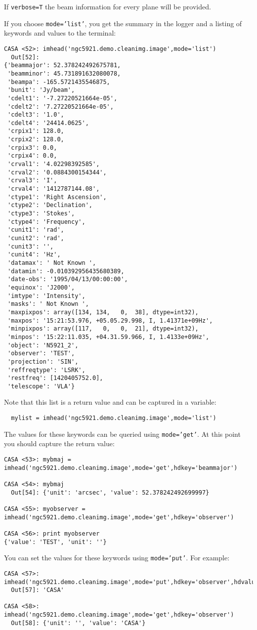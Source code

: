 If {\tt verbose=T} the beam information for every plane will be provided.

If you choose {\tt mode='list'}, you get the summary in the logger and
a listing of keywords and values to the terminal:
\small
\begin{verbatim}
CASA <52>: imhead('ngc5921.demo.cleanimg.image',mode='list')
  Out[52]: 
{'beammajor': 52.378242492675781,
 'beamminor': 45.731891632080078,
 'beampa': -165.5721435546875,
 'bunit': 'Jy/beam',
 'cdelt1': '-7.27220521664e-05',
 'cdelt2': '7.27220521664e-05',
 'cdelt3': '1.0',
 'cdelt4': '24414.0625',
 'crpix1': 128.0,
 'crpix2': 128.0,
 'crpix3': 0.0,
 'crpix4': 0.0,
 'crval1': '4.02298392585',
 'crval2': '0.0884300154344',
 'crval3': 'I',
 'crval4': '1412787144.08',
 'ctype1': 'Right Ascension',
 'ctype2': 'Declination',
 'ctype3': 'Stokes',
 'ctype4': 'Frequency',
 'cunit1': 'rad',
 'cunit2': 'rad',
 'cunit3': '',
 'cunit4': 'Hz',
 'datamax': ' Not Known ',
 'datamin': -0.010392956435680389,
 'date-obs': '1995/04/13/00:00:00',
 'equinox': 'J2000',
 'imtype': 'Intensity',
 'masks': ' Not Known ',
 'maxpixpos': array([134, 134,   0,  38], dtype=int32),
 'maxpos': '15:21:53.976, +05.05.29.998, I, 1.41371e+09Hz',
 'minpixpos': array([117,   0,   0,  21], dtype=int32),
 'minpos': '15:22:11.035, +04.31.59.966, I, 1.4133e+09Hz',
 'object': 'N5921_2',
 'observer': 'TEST',
 'projection': 'SIN',
 'reffreqtype': 'LSRK',
 'restfreq': [1420405752.0],
 'telescope': 'VLA'}
\end{verbatim}
\normalsize
Note that this list is a return value and can be captured in a
variable:
\small
\begin{verbatim}
  mylist = imhead('ngc5921.demo.cleanimg.image',mode='list')
\end{verbatim}
\normalsize

The values for these keywords can be queried using {\tt mode='get'}.
At this point you should capture the return value:
\small
\begin{verbatim}
CASA <53>: mybmaj = imhead('ngc5921.demo.cleanimg.image',mode='get',hdkey='beammajor')

CASA <54>: mybmaj
  Out[54]: {'unit': 'arcsec', 'value': 52.378242492699997}

CASA <55>: myobserver = imhead('ngc5921.demo.cleanimg.image',mode='get',hdkey='observer')

CASA <56>: print myobserver
{'value': 'TEST', 'unit': ''}
\end{verbatim}
\normalsize

You can set the values for these keywords using
{\tt mode='put'}.  For example:
\small
\begin{verbatim}
CASA <57>: imhead('ngc5921.demo.cleanimg.image',mode='put',hdkey='observer',hdvalue='CASA')
  Out[57]: 'CASA'

CASA <58>: imhead('ngc5921.demo.cleanimg.image',mode='get',hdkey='observer')
  Out[58]: {'unit': '', 'value': 'CASA'}
\end{verbatim}
\normalsize

